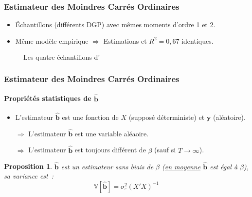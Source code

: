 \documentclass[10pt]{beamer}
\theoremstyle{plain}
\newtheorem{prop}{Proposition}
\begin{document}
\begin{frame}[c]
  \frametitle{Estimateur des Moindres Carrés Ordinaires}

  \begin{itemize}

  \item Échantillons (différents DGP) avec mêmes moments d'ordre 1 et 2.\newline

  \item Même modèle empirique $\Rightarrow$ Estimations et $R^2=0,67$ identiques.

  \end{itemize}

  \begin{figure}
    \centering
    \scalebox{.5}{
      }
    \label{fig:02}
    \caption{Les quatre échantillons d'\cite{Anscombe1973}}
  \end{figure}

\end{frame}



\begin{frame}
  \frametitle{Estimateur des Moindres Carrés Ordinaires}
  \framesubtitle {Propriétés statistiques de $\hat{\mathbf b}$}

  \begin{itemize}

  \item L'estimateur $\hat{\mathbf b}$ est une fonction de $X$ (supposé déterministe) et $\mathbf y$ (aléatoire).\newline

  \item[$\Rightarrow$] L'estimateur $\hat{\mathbf b}$ est une variable aléaoire.\newline

  \item[$\Rightarrow$] L'estimateur $\hat{\mathbf b}$ est toujours différent de $\beta$ (sauf si $T\rightarrow\infty$).\newline

  \end{itemize}


  \begin{prop}\label{prop:biais-variance}
    $\hat{\mathbf b}$ est un estimateur sans biais de $\beta$ (\underline{en moyenne} $\hat{\mathbf b}$ est égal à $\beta$), sa variance est~:
    \[
      \mathbb V \left[ \hat{\mathbf b} \right] = \sigma_{\varepsilon}^2(X'X)^{-1}
    \]
  \end{prop}

\end{frame}
\end{document}
